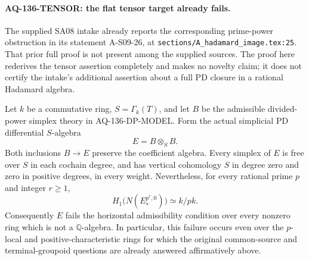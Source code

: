 \documentclass[11pt,a4paper]{article}
\theoremstyle{definition}\newtheorem{definition}[theorem]{Definition}
\theoremstyle{remark}\newtheorem{remark}[theorem]{Remark}
\begin{document}
\paragraph{AQ-136-TENSOR: the flat tensor target already fails.}
The supplied SA08 intake already reports the corresponding
prime-power obstruction in its statement A-S09-26, at
\texttt{sections/A\_hadamard\_image.tex:25}. That prior full
proof is not present among the supplied sources. The proof here
rederives the tensor assertion completely and makes no novelty
claim; it does not certify the intake's additional assertion
about a full PD closure in a rational Hadamard algebra.

Let $k$ be a commutative ring, $S=\Gamma_k(T)$, and let $B$ be
the admissible divided-power simplex theory in AQ-136-DP-MODEL.
Form the actual simplicial PD differential $S$-algebra
\[
                         E=B\otimes_S B.
\]
Both inclusions $B\to E$ preserve the coefficient algebra.
Every simplex of $E$ is free over $S$ in each cochain degree,
and has vertical cohomology $S$ in degree zero and zero in
positive degrees, in every weight. Nevertheless, for every
rational prime $p$ and integer $r\geq1$,
\[
 H_1\bigl(N(E^{p^r,0}_*)\bigr)\simeq k/pk.                 \tag{136.T1}
\]
Consequently $E$ fails the horizontal admissibility condition
over every nonzero ring which is not a $\mathbb Q$-algebra.
In particular, this failure occurs even over the $p$-local
and positive-characteristic rings for which the original
common-source and terminal-groupoid questions are already
answered affirmatively above.
\end{document}
